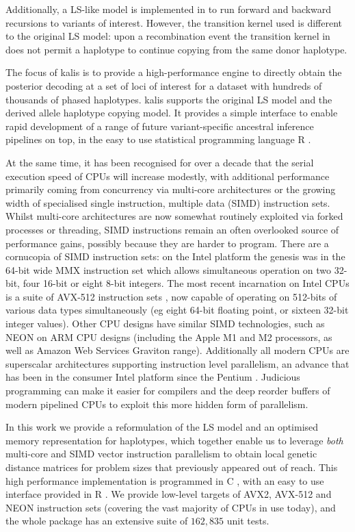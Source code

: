 \documentclass[pdflatex,referee,lineno,sn-nature]{sn-jnl}%
\let\proglang=\textsf
\newcommand{\pkg}[1]{{\fontseries{m}\fontseries{b}\selectfont #1}}
\begin{document}
Additionally, a LS-like model is implemented in \cite{rosen} to run forward and backward recursions to variants of interest.
However, the transition kernel used is different to the original LS model: upon a recombination event the transition kernel in \cite{rosen} does not permit a haplotype to continue copying from the same donor haplotype.

The focus of \pkg{kalis} is to provide a high-performance engine to directly obtain the posterior decoding at a set of loci of interest for a dataset with hundreds of thousands of phased haplotypes. \pkg{kalis} supports the original LS model and the derived allele haplotype copying model.
It provides a simple interface to enable rapid development of a range of future variant-specific ancestral inference pipelines on top, in the easy to use statistical programming language \proglang{R} \cite{R}.

At the same time, it has been recognised for over a decade \cite{sutter2005free} that the serial execution speed of CPUs will increase modestly, with additional performance primarily coming from concurrency via multi-core architectures or the growing width of specialised single instruction, multiple data (SIMD) instruction sets.
Whilst multi-core architectures are now somewhat routinely exploited via forked processes or threading, SIMD instructions remain an often overlooked source of performance gains, possibly because they are harder to program.
There are a cornucopia of SIMD instruction sets: on the Intel platform the genesis was in the 64-bit wide MMX instruction set \cite{mmx} which allows simultaneous operation on two 32-bit, four 16-bit or eight 8-bit integers.
The most recent incarnation on Intel CPUs is a suite of AVX-512 instruction sets \cite{intelisa}, now capable of operating on 512-bits of various data types simultaneously (eg eight 64-bit floating point, or sixteen 32-bit integer values).
Other CPU designs have similar SIMD technologies, such as NEON on ARM CPU \cite{armneon} designs (including the Apple M1 and M2 processors, as well as Amazon Web Services Graviton range).
Additionally all modern CPUs are superscalar architectures supporting instruction level parallelism, an advance that has been in the consumer Intel platform since the Pentium \cite{pentium}.
Judicious programming can make it easier for compilers and the deep reorder buffers of modern pipelined CPUs to exploit this more hidden form of parallelism.

In this work we provide a reformulation of the LS model and an optimised memory representation for haplotypes, which together enable us to leverage \emph{both} multi-core and SIMD vector instruction parallelism to obtain local genetic distance matrices for problem sizes that previously appeared out of reach.
This high performance implementation is programmed in \proglang{C} \cite{C18}, with an easy to use interface provided in \proglang{R} \cite{R}.
We provide low-level targets of AVX2, AVX-512 and NEON instruction sets (covering the vast majority of CPUs in use today), and the whole package has an extensive suite of \(162,835\) unit tests.
\end{document}
